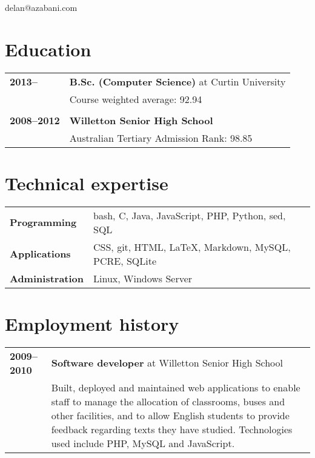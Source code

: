 \documentclass[a4paper,12pt]{article}
\begin{document}
\hrulefill

\hspace{1cm}\begin{minipage}{7cm}
	{\Huge delan\textcolor{lg}@azabani\textcolor{lg}{.com}}
\end{minipage}\hfill\begin{minipage}{4cm}
\end{minipage}\hspace{1cm}

\hrulefill

\section*{Education}

\begin{tabular}{p{4cm}p{14cm}}
	\textbf{2013--} &
		\textbf{B.Sc. (Computer Science)} at Curtin University\\
		& Course weighted average: 92.94\\\\
	\textbf{2008--2012} &
		\textbf{Willetton Senior High School}\\
		& Australian Tertiary Admission Rank: 98.85\\
\end{tabular}

\section*{Technical expertise}

\begin{tabular}{p{4cm}p{14cm}}
	\textbf{Programming} &
		bash, C, Java, JavaScript, PHP, Python, sed, SQL \\
	\textbf{Applications} &
		CSS, git, HTML, \LaTeX, Markdown, MySQL, PCRE, SQLite \\
	\textbf{Administration} &
		Linux, Windows Server \\
\end{tabular}

\section*{Employment history}

\begin{tabular}{p{4cm}p{14cm}}
	\textbf{2009--2010} &
		\textbf{Software developer} at Willetton Senior High School\\ &
		Built, deployed and maintained web applications to enable staff
		to manage the allocation of classrooms, buses and other
		facilities, and to allow English students to provide feedback
		regarding texts they have studied. Technologies used include
		PHP, MySQL and JavaScript.\\
\end{tabular}
\end{document}
